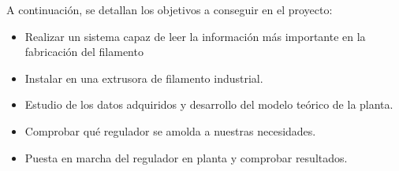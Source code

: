 A continuación, se detallan los objetivos a conseguir en el proyecto:

\begin{itemize}
    \item Realizar un sistema capaz de leer la información más importante en la fabricación del filamento
    \item Instalar en una extrusora de filamento industrial.
    \item Estudio de los datos adquiridos y desarrollo del modelo teórico de la planta.
    \item Comprobar qué regulador se amolda a nuestras necesidades.
    \item Puesta en marcha del regulador en planta y comprobar resultados.
\end{itemize}
\label{Listado_objetivos}



